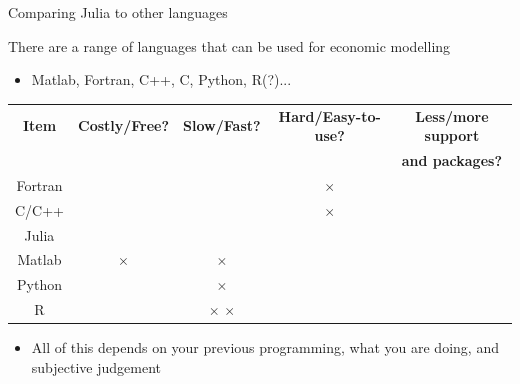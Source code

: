 \documentclass[aspectratio=169]{beamer}
\begin{document}
\begin{frame}{Comparing Julia to other languages}

There are a range of languages that can be used for economic modelling
\begin{itemize}
	\item Matlab, Fortran, C++, C, Python, R(?)...
\end{itemize}
\vspace{0.5cm}

  \begin{tabular}{|c|c|c|c|c|}
	\hline
	\textbf{Item} & \textbf{Costly/Free?} & \textbf{Slow/Fast?} & \textbf{Hard/Easy-to-use?}  & \textbf{Less/more support}  \\
	& & & & \textbf{and packages?} \\
	\hline
	Fortran & \checkmark & \checkmark \checkmark & $\times$ & \checkmark \checkmark  \\
	\hline
	C/C++ & \checkmark & \checkmark \checkmark & $\times$ & \checkmark \checkmark \\
	\hline
	Julia & \checkmark & \checkmark & \checkmark & \checkmark  \\
	\hline
	Matlab & $\times$ & $\times$ & \checkmark \checkmark & \checkmark \\
	\hline
	Python & \checkmark & $\times$ & \checkmark & \checkmark \\
	\hline
	R & \checkmark & $\times$ $\times$  & \checkmark & \checkmark \checkmark \\
	\hline
\end{tabular}

\vspace{0.5cm}
\begin{itemize}
	\item All of this depends on your previous programming, what you are doing, and subjective judgement
\end{itemize}

\end{frame}
\end{document}
